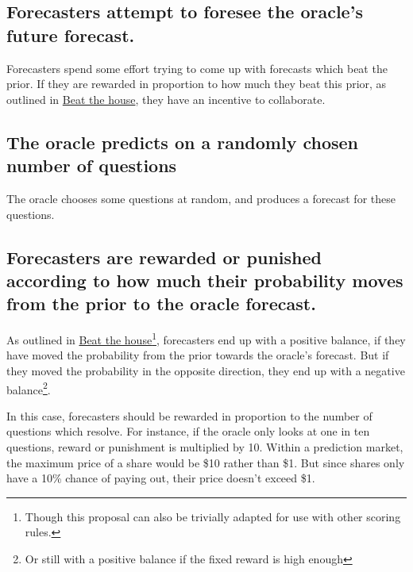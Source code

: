 \documentclass[]{article}
\begin{document}
\hypertarget{forecasters-attempt-to-foresee-the-oracles-future-forecast.}{%
\subsection{Forecasters attempt to foresee the oracle's future
forecast.}\label{forecasters-attempt-to-foresee-the-oracles-future-forecast.}}

Forecasters spend some effort trying to come up with forecasts which
beat the prior. If they are rewarded in proportion to how much they beat
this prior, as outlined in
\href{https://github.com/SamotsvetyForecasting/optimal-scoring/blob/master/1-beat-the-house/beat-the-house.pdf}{Beat
the house}, they have an incentive to collaborate.

\hypertarget{the-oracle-predicts-on-a-randomly-chosen-number-of-questions}{%
\subsection{The oracle predicts on a randomly chosen number of
questions}\label{the-oracle-predicts-on-a-randomly-chosen-number-of-questions}}

The oracle chooses some questions at random, and produces a forecast for
these questions.

\hypertarget{forecasters-are-rewarded-or-punished-according-to-how-much-their-probability-moves-from-the-prior-to-the-oracle-forecast.}{%
\subsection{Forecasters are rewarded or punished according to how much
their probability moves from the prior to the oracle
forecast.}\label{forecasters-are-rewarded-or-punished-according-to-how-much-their-probability-moves-from-the-prior-to-the-oracle-forecast.}}

As outlined in
\href{https://github.com/SamotsvetyForecasting/optimal-scoring/blob/master/1-beat-the-house/beat-the-house.pdf}{Beat
the house}\footnote{Though this proposal can also be trivially adapted
  for use with other scoring rules.}, forecasters end up with a positive
balance, if they have moved the probability from the prior towards the
oracle's forecast. But if they moved the probability in the opposite
direction, they end up with a negative
balance\footnote{Or still with a positive balance if the fixed reward is high enough}.

In this case, forecasters should be rewarded in proportion to the number
of questions which resolve. For instance, if the oracle only looks at
one in ten questions, reward or punishment is multiplied by 10. Within a
prediction market, the maximum price of a share would be \$10 rather
than \$1. But since shares only have a 10\% chance of paying out, their
price doesn't exceed \$1.
\end{document}
